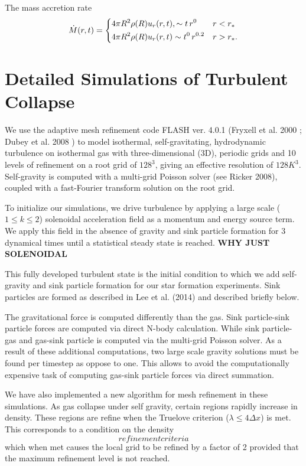 \documentclass{emulateapj}
\newcommand{\be}{\begin{equation}}
\newcommand{\ee}{\end{equation}}
\begin{document}
The mass accretion rate 
%
\be
\dot M(r,t)=
\begin{dcases}
4\pi R^2\rho(R)u_r(r,t), \sim t\,r^{0} & r<r_*\\
4\pi R^2\rho(R)u_r(r,t) \sim t^0\,r^{0.2} & r>r_*.
\end{dcases}
\ee
%


\section{Detailed Simulations of Turbulent Collapse}

We use the adaptive mesh refinement code FLASH ver. 4.0.1 (Fryxell et al.
2000
; Dubey
et al.
2008
) to model isothermal, self-gravitating, hydrodynamic turbulence on isothermal gas with three-dimensional (3D),
periodic grids and 10 levels of refinement on a root grid of $128^3$, giving an effective resolution of $128K^3$.  
Self-gravity is computed with a multi-grid Poisson solver (see Ricker
2008), coupled with a fast-Fourier transform solution on the root grid.

To initialize our simulations, we drive turbulence by applying a large scale ($1 \le k \le 2$) solenoidal 
acceleration field as a momentum and energy source term.  We apply this field in the absence of gravity and sink particle formation for 3 dynamical times until a statistical steady state is reached.
{\bf WHY JUST SOLENOIDAL}

This fully developed turbulent state is the initial condition to which we add self-gravity and sink particle formation for
our star formation experiments. Sink particles are formed as described in Lee et al. (2014) and described briefly below.  

The gravitational force is computed differently than the gas. Sink particle-sink particle forces are computed via direct N-body calculation. While sink particle-gas and gas-sink particle is computed via the multi-grid Poisson solver.  As a result of these additional computations, two large scale gravity solutions must be found per timestep as oppose to one.  This allows to avoid the computationally expensive task of computing gas-sink particle forces via direct summation. 

We have also implemented a new algorithm for mesh refinement in these simulations.  As gas collapse under self gravity, certain regions rapidly increase in density.  These regions are refine when the Truelove criterion ($\lambda \le 4 \Delta x$) is met. This corresponds to a condition on the density 
\begin{equation}
refinement criteria
\end{equation}
which when met causes the local grid to be refined by a factor of 2 provided that the maximum refinement level is not reached.
\end{document}
